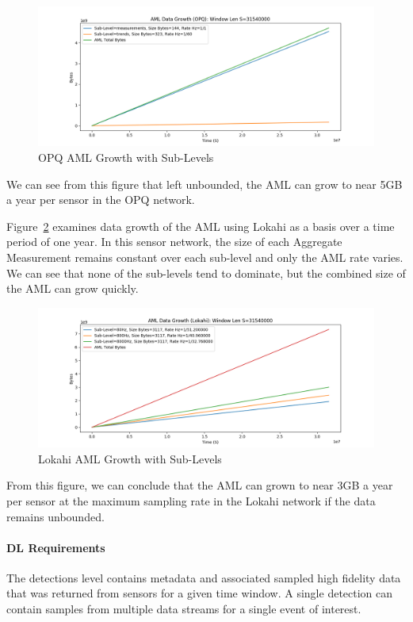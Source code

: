 \begin{figure}[H]
	\centering
	\includegraphics[width=\linewidth]{figures/plot_aml_level_opq_single.png}
	\caption{OPQ AML Growth with Sub-Levels}
	\label{fig:plot_aml_level_opq_single}
\end{figure}

We can see from this figure that left unbounded, the AML can grow to near 5GB a year per sensor in the OPQ network.

Figure~\ref{fig:plot_aml_level_lokahi_single} examines data growth of the AML using Lokahi as a basis over a time period of one year. In this sensor network, the size of each Aggregate Measurement remains constant over each sub-level and only the AML rate varies. We can see that none of the sub-levels tend to dominate, but the combined size of the AML can grow quickly.

\begin{figure}[H]
	\centering
	\includegraphics[width=\linewidth]{figures/plot_aml_level_lokahi_single.png}
	\caption{Lokahi AML Growth with Sub-Levels}
	\label{fig:plot_aml_level_lokahi_single}
\end{figure}

From this figure, we can conclude that the AML can grown to near 3GB a year per sensor at the maximum sampling rate in the Lokahi network if the data remains unbounded.

\paragraph{DL Requirements}
The detections level contains metadata and associated sampled high fidelity data that was returned from sensors for a given time window. A single detection can contain samples from multiple data streams for a single event of interest.

